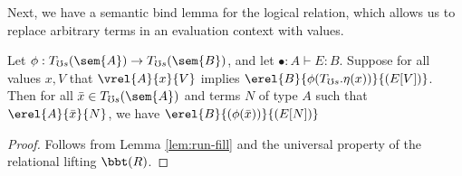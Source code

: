 Next, we have a semantic bind lemma for the logical relation, which allows us to
replace arbitrary terms in an evaluation context with values.

\begin{lemma}\label{lem:monadic-bind}
  Let $\phi : T_{\mho s}(\sem{A}) \to T_{\mho s}(\sem{B})$, and let $\bullet : A \vdash E : B$.
  Suppose for all values $x, V$ that $\vrel{A}{x}{V}$ implies $\erel{B}{\phi(T_{\mho s}.\eta(x))}{(E[V])}$.
  Then for all $\bar{x} \in T_{\mho s}(\sem{A})$ and terms $N$ of type $A$ such that
  $\erel{A}{\bar{x}}{N}$, we have $\erel{B}{(\phi(\bar{x}))}{(E[N])}$
\end{lemma}
\begin{proof}
    Follows from Lemma \ref{lem:run-fill} and the universal property of the
    relational lifting $\bbt(R)$.
\end{proof}

